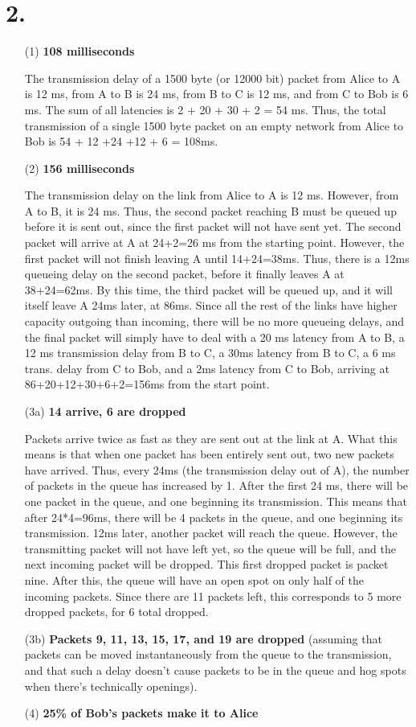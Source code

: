\documentclass[11pt]{article}
\begin{document}
\section*{2.}

\begin{itemize}
\item[(1)] \textbf{108 milliseconds}

The transmission delay of a 1500 byte (or 12000 bit) packet from Alice to A is 12 ms, from A to B is 24 ms, from B to C is 12 ms, and from C to Bob is 6 ms. The sum of all latencies is 2 + 20 + 30 + 2 = 54 ms. Thus, the total transmission of a single 1500 byte packet on an empty network from Alice to Bob is 54 + 12 +24 +12 + 6 = 108ms.
\item[(2)] \textbf{156 milliseconds}

The transmission delay on the link from Alice to A is 12 ms. However, from A to B, it is 24 ms. Thus, the second packet reaching B must be queued up before it is sent out, since the first packet will not have sent yet. The second packet will arrive at A at 24+2=26 ms from the starting point. However, the first packet will not finish leaving A until 14+24=38ms. Thus, there is a 12ms queueing delay on the second packet, before it finally leaves A at 38+24=62ms. By this time, the third packet will be queued up, and it will itself leave A 24ms later, at 86ms. Since all the rest of the links have higher capacity outgoing than incoming, there will be no more queueing delays, and the final packet will simply have to deal with a 20 ms latency from A to B, a 12 ms transmission delay from B to C, a 30ms latency from B to C, a 6 ms trans. delay from C to Bob, and a 2ms latency from C to Bob, arriving at 86+20+12+30+6+2=156ms from the start point.
\item[(3a)] \textbf{14 arrive, 6 are dropped}

Packets arrive twice as fast as they are sent out at the link at A. What this means is that when one packet has been entirely sent out, two new packets have arrived. Thus, every 24ms (the transmission delay out of A), the number of packets in the queue has increased by 1. After the first 24 ms, there will be one packet in the queue, and one beginning its transmission. This means that after 24*4=96ms, there will be 4 packets in the queue, and one beginning its transmission. 12ms later, another packet will reach the queue. However, the transmitting packet will not have left yet, so the queue will be full, and the next incoming packet will be dropped. This first dropped packet is packet nine. After this, the queue will have an open spot on only half of the incoming packets. Since there are 11 packets left, this corresponds to 5 more dropped packets, for 6 total dropped. 
\item[(3b)] \textbf{Packets 9, 11, 13, 15, 17, and 19 are dropped} (assuming that packets can be moved instantaneously from the queue to the transmission, and that such a delay doesn't cause packets to be in the queue and hog spots when there's technically openings).
\item[(4)] \textbf{25\% of Bob's packets make it to Alice}


\end{itemize}
\end{document}
